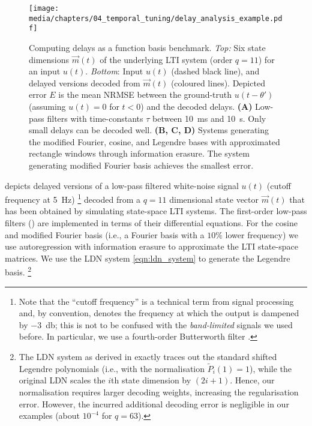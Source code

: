 \begin{figure}[t]
	\centering
	\texttt{[image: media/chapters/04\_temporal\_tuning/delay\_analysis\_example.pdf]}%
	{\label{fig:delay_analysis_example_a}}%
	{\label{fig:delay_analysis_example_b}}%
	{\label{fig:delay_analysis_example_c}}%
	{\label{fig:delay_analysis_example_d}}%
	\caption[Computing delays as a function basis benchmark]{Computing delays as a function basis benchmark.
	\emph{Top:} Six state dimensions $\vec m(t)$ of the underlying LTI system (order $q = 11$) for an input $u(t)$.
	\emph{Bottom}: Input $u(t)$ (dashed black line), and delayed versions decoded from $\vec m(t)$ (coloured lines).
	Depicted error $E$ is the mean NRMSE between the ground-truth $u(t - \theta')$ (assuming $u(t) = 0$ for $t < 0$) and the decoded delays.
	\textbf{(A)} Low-pass filters with time-constants $\tau$ between \SI{10}{\milli\second} and \SI{10}{\second}.
	Only small delays can be decoded well.
	\textbf{(B, C, D)} Systems generating the modified Fourier, cosine, and Legendre bases with approximated rectangle windows through information erasure.
	The system generating modified Fourier basis achieves the smallest error.
	}
	\vspace*{-1em}
	\label{fig:delay_analysis_example}
\end{figure}
 depicts delayed versions of a low-pass filtered white-noise signal $u(t)$ (cutoff frequency at \SI{5}{\hertz})%
\footnote{
Note that the \enquote{cutoff frequency} is a technical term from signal processing and, by convention, denotes the frequency at which the output is dampened by \SI{-3}{\decibel}; this is not to be confused with the \emph{band-limited} signals we used before.
In particular, we use a fourth-order Butterworth filter \citep[e.g.][Section~7.3]{oppenheim2009discretetime}.
}
decoded from a $q = 11$ dimensional state vector $\vec m(t)$ that has been obtained by simulating state-space LTI systems.
The first-order low-pass filters () are implemented in terms of their differential equations.
For the cosine and modified Fourier basis (i.e., a Fourier basis with a $10\%$ lower frequency) we use autoregression with information erasure to approximate the LTI state-space matrices.
We use the LDN system \cref{eqn:ldn_system} to generate the Legendre basis.%
\footnote{The LDN system as derived in  exactly traces out the standard shifted Legendre polynomials (i.e., with the normalisation $\tilde P_i(1) = 1$), while the original LDN \citep{voelker2019} scales the $i$th state dimension by $(2i + 1)$.
Hence, our normalisation requires larger decoding weights, increasing the regularisation error.
However, the incurred additional decoding error is negligible in our examples (about $10^{-4}$ for $q = 63$).
}

